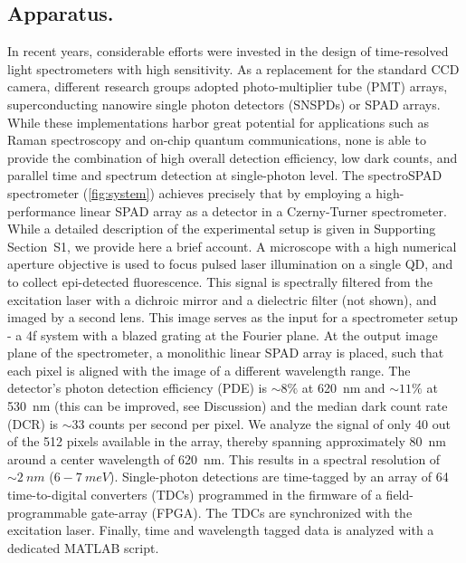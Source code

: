 \documentclass[journal=nalefd, manuscript=letter, layout=twocolumn]{achemso}
\newcommand{\supp}[1]{Supporting Section~S#1}
\begin{document}
\subsection*{Apparatus.}
In recent years, considerable efforts were invested in the design of time-resolved light spectrometers with high sensitivity\cite{Blacksberg2011,Gudkov2015,Krstajic2015,Cheng2019,Hartmann2020}. As a replacement for the standard CCD camera, different research groups adopted photo-multiplier tube (PMT) arrays\cite{Gudkov2015}, superconducting nanowire single photon detectors (SNSPDs)\cite{Kahl2017,Cheng2019,Hartmann2020} or SPAD arrays\cite{Nissinen2011,Blacksberg2011,Krstajic2015,Ghezzi2021}. While these implementations harbor great potential for applications such as Raman spectroscopy and on-chip quantum communications, none is able to provide the combination of high overall detection efficiency, low dark counts, and parallel time and spectrum detection at single-photon level. The spectroSPAD spectrometer (\autoref{fig:system}) achieves precisely that by employing a high-performance linear SPAD array as a detector in a Czerny-Turner spectrometer. While a detailed description of the experimental setup is given in \supp{1}, we provide here a brief account. A microscope with a high numerical aperture objective is used to focus pulsed laser illumination on a single QD, and to collect epi-detected fluorescence. This signal is spectrally filtered from the excitation laser with a dichroic mirror and a dielectric filter (not shown), and imaged by a second lens. This image serves as the input for a spectrometer setup - a 4f system with a blazed grating at the Fourier plane. At the output image plane of the spectrometer, a monolithic linear SPAD array is placed, such that each pixel is aligned with the image of a different wavelength range. The detector's photon detection efficiency (PDE) is ${\sim}8\%$ at \SI{620}{nm} and ${\sim}11\%$ at \SI{530}{nm} (this can be improved, see Discussion) and the median dark count rate (DCR) is ${\sim}33$ counts per second per pixel. We analyze the signal of only 40 out of the 512 pixels available in the array, thereby spanning approximately \SI{80}{nm} around a center wavelength of \SI{620}{nm}. This results in a spectral resolution of ${\sim}\SI{2}{nm}$ ($6{-}\SI{7}{meV}$). Single-photon detections are time-tagged by an array of 64 time-to-digital converters (TDCs) programmed in the firmware of a field-programmable gate-array (FPGA). The TDCs are synchronized with the excitation laser. Finally, time and wavelength tagged data is analyzed with a dedicated MATLAB script.
\end{document}
